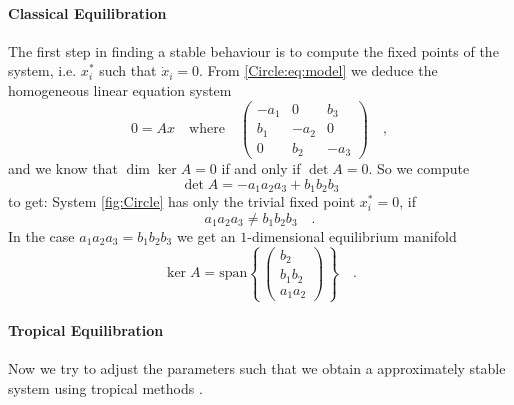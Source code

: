 	\paragraph*{Classical Equilibration}
	The first step in finding a stable behaviour is to compute the fixed points of 
	the system, i.e. $x^*_i$ such that $\dot{x}_i=0$. From \eqref{Circle:eq:model} we
	deduce the homogeneous linear equation system
	\begin{equation}0 = A x \quad \text{where} \quad 
	\begin{pmatrix}
	-a_1 & 0 & b_3 \\ b_1 &-a_2 & 0 \\ 0 & b_2 & -a_3 
	\end{pmatrix} \quad ,
	\end{equation}
	and we know that $\dim \ker A = 0$ if and only if $\det A =0$. 
	So we compute
	\begin{equation}
	\det A = -a_1a_2a_3 + b_1 b_2 b_3
	\end{equation}
	to get: System \eqref{fig:Circle} has only the trivial fixed point $x_i^*=0$, if
	\begin{equation}
	a_1a_2a_3 \neq b_1 b_2 b_3 \quad .
	\end{equation}
	In the case $a_1a_2a_3=b_1b_2b_3$ we get an $1$-dimensional equilibrium manifold
	\begin{equation}
	\ker A = \text{span}\left\{\,\begin{pmatrix}
	b_2 \\ b_1 b_2 \\ a_1 a_2
	\end{pmatrix} \, \right\} \quad .
	\end{equation}
	
	\paragraph*{Tropical Equilibration}
	Now we try to adjust the parameters such that we obtain a approximately stable 
	system using tropical methods \cite{Trop}.\\
	

